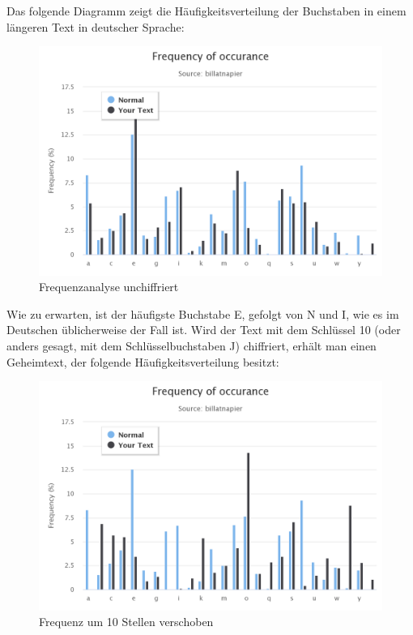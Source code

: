 \documentclass[10pt,a4paper]{article}
\begin{document}
\noindent
Das folgende Diagramm zeigt die Häufigkeitsverteilung der Buchstaben in einem längeren Text in deutscher Sprache:
\begin{figure}[H]
    \begin{center}
    \includegraphics[width=16cm]{images/frequency0.png}
    \caption{Frequenzanalyse unchiffriert}
    \label{frequencynormal}
    \end{center}
\end{figure}

\noindent
Wie zu erwarten, ist der häufigste Buchstabe E, gefolgt von N und I, wie es im Deutschen üblicherweise der Fall ist. Wird der Text mit dem Schlüssel 10 (oder anders gesagt, mit dem Schlüsselbuchstaben J) chiffriert, erhält man einen Geheimtext, der folgende Häufigkeitsverteilung besitzt:
\begin{figure}[H]
    \begin{center}
    \includegraphics[width=16cm]{images/frequency1.png}
    \caption{Frequenz um 10 Stellen verschoben}
    \label{frequencycaesar}
    \end{center}
\end{figure}
\end{document}
